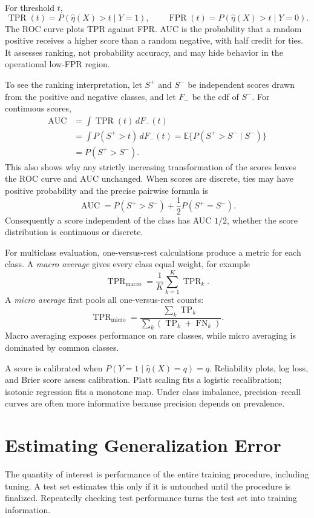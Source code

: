 \documentclass[12pt,oneside]{book}
\numberwithin{equation}{section}
\theoremstyle{definition}
\theoremstyle{plain}
\theoremstyle{remark}
\newcommand{\E}{\mathbb{E}}
\begin{document}
For threshold $t$,
\[
 \operatorname{TPR}(t)=P(\widehat\eta(X)>t\mid Y=1),\qquad
 \operatorname{FPR}(t)=P(\widehat\eta(X)>t\mid Y=0).
\]
The ROC curve plots TPR against FPR. AUC is the probability that a random
positive receives a higher score than a random negative, with half credit for
ties. It assesses ranking, not probability accuracy, and may hide behavior in
the operational low-FPR region.

To see the ranking interpretation, let $S^+$ and $S^-$ be independent scores
drawn from the positive and negative classes, and let $F_-$ be the cdf of
$S^-$. For continuous scores,
\begin{align*}
 \operatorname{AUC}
 &=\int \operatorname{TPR}(t)\,dF_-(t)\\
 &=\int P(S^+>t)\,dF_-(t)
 =\E\{P(S^+>S^-\mid S^-)\}\\
 &=P(S^+>S^-).
\end{align*}
This also shows why any strictly increasing transformation of the scores
leaves the ROC curve and AUC unchanged.
When scores are discrete, ties may have positive probability and the precise
pairwise formula is
\[
 \operatorname{AUC}=P(S^+>S^-)+\frac12P(S^+=S^-).
\]
Consequently a score independent of the class has AUC $1/2$, whether the score
distribution is continuous or discrete.

For multiclass evaluation, one-versus-rest calculations produce a metric for
each class. A \emph{macro average} gives every class equal weight, for example
\[
 \operatorname{TPR}_{\mathrm{macro}}
 =\frac1K\sum_{k=1}^K\operatorname{TPR}_k.
\]
A \emph{micro average} first pools all one-versus-rest counts:
\[
 \operatorname{TPR}_{\mathrm{micro}}
 =\frac{\sum_k\operatorname{TP}_k}
        {\sum_k(\operatorname{TP}_k+\operatorname{FN}_k)}.
\]
Macro averaging exposes performance on rare classes, while micro averaging is
dominated by common classes.

A score is calibrated when
$P(Y=1\mid\widehat\eta(X)=q)=q$. Reliability plots, log loss, and Brier score
assess calibration. Platt scaling fits a logistic recalibration; isotonic
regression fits a monotone map. Under class imbalance, precision--recall
curves are often more informative because precision depends on prevalence.

\section{Estimating Generalization Error}

The quantity of interest is performance of the entire training procedure,
including tuning. A test set estimates this only if it is untouched until the
procedure is finalized. Repeatedly checking test performance turns the test
set into training information.
\end{document}
